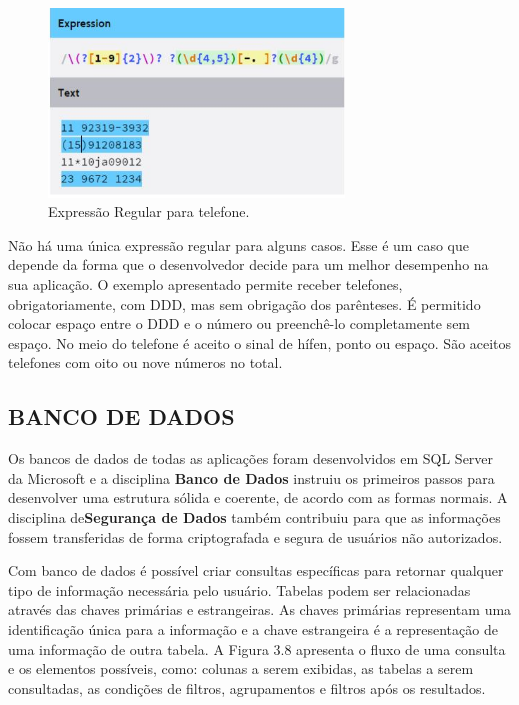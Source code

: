 \documentclass[
  12pt,				%
  openany,
  oneside,
  a4paper,			%
  english,			%
  brazil
]{article}
\numberwithin{figure}{section}
\numberwithin{table}{section}
\begin{document}
\begin{figure}[!htb]
\centering
\includegraphics[width=0.7\textwidth]{figura37}
\caption{Expressão Regular para telefone.}
\end{figure}

Não há uma única expressão regular para alguns casos. Esse é um caso que depende da forma que o desenvolvedor decide para um melhor desempenho na sua aplicação. O exemplo apresentado permite receber telefones, obrigatoriamente, com DDD, mas sem obrigação dos parênteses. É permitido colocar espaço entre o DDD e o número ou preenchê-lo completamente sem espaço. No meio do telefone é aceito o sinal de hífen, ponto ou espaço. São aceitos telefones com oito ou nove números no total.



\subsection{BANCO DE DADOS}

Os bancos de dados de todas as aplicações foram desenvolvidos em SQL Server da Microsoft e a disciplina \textbf{Banco de Dados} instruiu os primeiros passos para desenvolver uma estrutura sólida e coerente, de acordo com as formas normais. A disciplina de\textbf{Segurança de Dados} também contribuiu para que as informações fossem transferidas de forma criptografada e segura de usuários não autorizados.

Com banco de dados é possível criar consultas específicas para retornar qualquer tipo de informação necessária pelo usuário. Tabelas podem ser relacionadas através das chaves primárias e estrangeiras. As chaves primárias representam uma identificação única para a informação e a chave estrangeira é a representação de uma informação de outra tabela. A Figura 3.8 apresenta o fluxo de uma consulta e os elementos possíveis, como: colunas a serem exibidas, as tabelas a serem consultadas, as condições de filtros, agrupamentos e filtros após os resultados.
\end{document}
